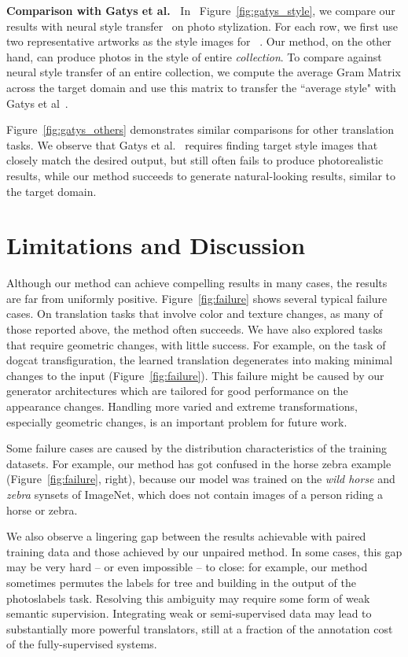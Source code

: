 \documentclass[10pt,twocolumn,letterpaper]{article}
\newcommand{\reffig}[1]{Figure~\ref{fig:#1}}
\begin{document}
{\bf Comparison with Gatys et al.~\cite{gatys2015neural}}
In ~\reffig{gatys_style}, we compare our results with neural style transfer~\cite{gatys2015neural} on photo stylization. For each row, we first use two representative artworks as the style images for ~\cite{gatys2015neural}. Our method, on the other hand, can produce photos in the style of entire \emph{collection}. To compare against neural style transfer of an entire collection, we compute the average Gram Matrix across the target domain and use this matrix to transfer the ``average style" with Gatys et al~\cite{gatys2015neural}. 

\reffig{gatys_others} demonstrates similar comparisons for other translation tasks. 
We observe that Gatys et al.~\cite{gatys2015neural} requires finding target style images that closely match the desired output, but still often fails to produce photorealistic results, while our method succeeds to generate natural-looking results, similar to the target domain.  \section{Limitations and Discussion}
Although our method can achieve compelling results in many cases, the results are far from uniformly positive. \reffig{failure} shows several typical failure cases. On translation tasks that involve color and texture changes, as many of those reported above, the method often succeeds. We have also explored tasks that require geometric changes, with little success. For example, on the task of dogcat transfiguration, the learned translation degenerates into making minimal changes to the input (\reffig{failure}). This failure might be caused by our generator architectures which are tailored for good performance on the appearance changes. Handling more varied and extreme transformations, especially geometric changes, is an important problem for future work.

Some failure cases are caused by the distribution characteristics of the training datasets. For example, our method  has got confused in the horse  zebra example (\reffig{failure}, right), because our model was trained on the {\it wild horse} and {\it zebra} synsets of ImageNet, which does not contain images of a person riding a horse or zebra.

We also observe a lingering gap between the results achievable with paired training data and those achieved by our unpaired method. In some cases, this gap may be very hard -- or even impossible -- to close: for example, our method sometimes permutes the labels for tree and building in the output of the photoslabels task. Resolving this ambiguity may require some form of weak semantic supervision. Integrating weak or semi-supervised data may lead to substantially more powerful translators, still at a fraction of the annotation cost of the fully-supervised systems.
\end{document}
